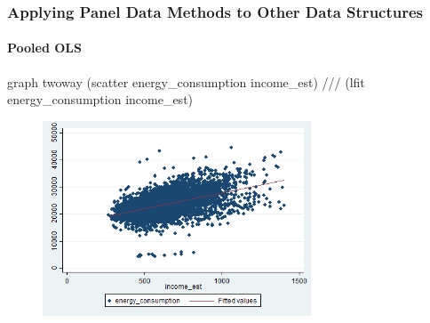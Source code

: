 \documentclass{beamer}
\begin{document}
\begin{frame}[fragile]
    \frametitle{Applying Panel Data Methods to Other Data Structures}
    \framesubtitle{Pooled OLS}
    \tiny
    \begin{CVerbatim}[fontsize=\tiny]
graph twoway (scatter energy_consumption income_est) ///
(lfit energy_consumption income_est)
    \end{CVerbatim}
    
    \begin{figure}
    \includegraphics[width=8cm]{../stata_code/ols.png}
    \centering
    \end{figure}
\end{frame}
  
\end{document}
